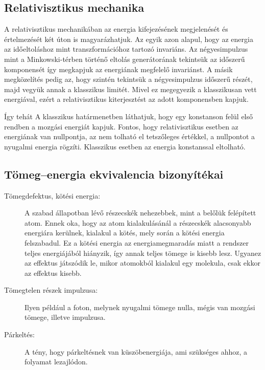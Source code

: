   \subsection{Relativisztikus mechanika}
   
   A relativisztikus mechanikában az energia kifejezésének megjelenését és értelmezését két úton is magyarázhatjuk. Az egyik azon alapul, hogy az energia az időeltoláshoz mint transzformációhoz tartozó invariáns. Az négyesimpulzus mint a Minkowski-térben történő eltolás generátorának tekintsük az időszerű komponensét így megkapjuk az energiának megfelelő invariánst. A másik megközelítés pedig az, hogy szintén tekintsük a négyesimpulzus időszerű részét, majd vegyük annak a klasszikus limitét. Mivel ez megegyezik a klasszikusan vett energiával, ezért a relativisztikus kiterjesztést az adott komponensben kapjuk. 
   
   Így tehát
   A klasszikus határmenetben láthatjuk, hogy egy konstanson felül első rendben a mozgási energiát kapjuk. Fontos, hogy relativisztikus esetben az energiának van nullpontja, az nem tolható el tetszőleges értékkel, a nullpontot a nyugalmi energia rögzíti. Klasszikus esetben az energia konstanssal eltolható. 
   
  \subsection{Tömeg--energia ekvivalencia bizonyítékai}
   
   \begin{description}
    \item[Tömegdefektus, kötési energia:] A szabad állapotban lévő részecskék nehezebbek, mint a belőlük felépített atom. Ennek oka, hogy az atom kialakulásánál a részecskék alacsonyabb energiára kerülnek, kialakul a kötés, mely során a kötési energia felszabadul. Ez a kötési energia az energiamegmaradás miatt a rendszer teljes energiájából hiányzik, így annak teljes tömege is kisebb lesz. Ugyanez az effektus játszódik le, mikor atomokból kialakul egy molekula, csak ekkor az effektus kisebb. 
    \item[Tömegtelen részek impulzusa:] Ilyen például a foton, melynek nyugalmi tömege nulla, mégis van mozgási tömege, illetve impulzusa. 
    \item[Párkeltés:] A tény, hogy párkeltésnek van küszöbenergiája, ami szükséges ahhoz, a folyamat lezajlódon.
   \end{description}
   
